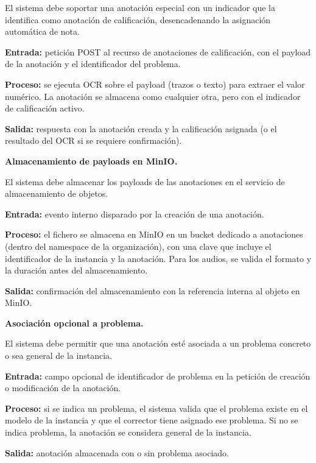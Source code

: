 \begin{functional}
\begin{functional}
    El sistema debe soportar una anotación especial con un indicador que la identifica como anotación de calificación, desencadenando la asignación automática de nota.

    \textbf{Entrada:} petición POST al recurso de anotaciones de calificación, con el payload de la anotación y el identificador del problema.

    \textbf{Proceso:} se ejecuta OCR sobre el payload (trazos o texto) para extraer el valor numérico. La anotación se almacena como cualquier otra, pero con el indicador de calificación activo.

    \textbf{Salida:} respuesta con la anotación creada y la calificación asignada (o el resultado del OCR si se requiere confirmación).

    \item \textbf{Almacenamiento de payloads en MinIO.}

    El sistema debe almacenar los payloads de las anotaciones en el servicio de almacenamiento de objetos.

    \textbf{Entrada:} evento interno disparado por la creación de una anotación.

    \textbf{Proceso:} el fichero se almacena en MinIO en un bucket dedicado a anotaciones (dentro del namespace de la organización), con una clave que incluye el identificador de la instancia y la anotación. Para los audios, se valida el formato y la duración antes del almacenamiento.

    \textbf{Salida:} confirmación del almacenamiento con la referencia interna al objeto en MinIO.

    \item \textbf{Asociación opcional a problema.}

    El sistema debe permitir que una anotación esté asociada a un problema concreto o sea general de la instancia.

    \textbf{Entrada:} campo opcional de identificador de problema en la petición de creación o modificación de la anotación.

    \textbf{Proceso:} si se indica un problema, el sistema valida que el problema existe en el modelo de la instancia y que el corrector tiene asignado ese problema. Si no se indica problema, la anotación se considera general de la instancia.

    \textbf{Salida:} anotación almacenada con o sin problema asociado.

  \end{functional}


\end{functional}
